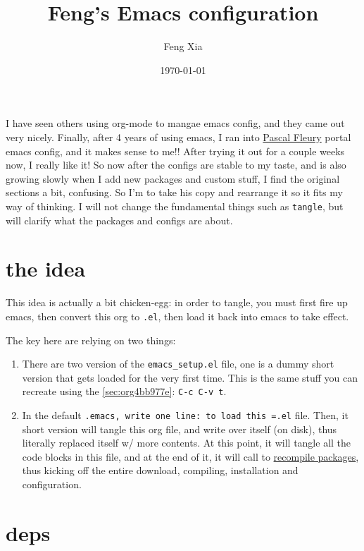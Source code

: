 \documentclass[11pt]{article}
\author{Feng Xia}
\date{\today}
\title{Feng's Emacs configuration}
\begin{document}
\maketitle
\tableofcontents

I have seen others using org-mode to mangae emacs config, and they
came out very nicely. Finally, after 4 years of using emacs, I ran
into \href{https://github.com/pascalfleury/emacs-config}{Pascal Fleury} portal emacs config, and it makes sense to me!!
After trying it out for a couple weeks now, I really like it! So now
after the configs are stable to my taste, and is also growing slowly
when I add new packages and custom stuff, I find the original sections
a bit, confusing. So I'm to take his copy and rearrange it so it fits
my way of thinking. I will not change the fundamental things such as
\texttt{tangle}, but will clarify what the packages and configs are about.

\section{the idea}
\label{sec:org28571e1}

This idea is actually a bit chicken-egg: in order to tangle, you must
first fire up emacs, then convert this org to \texttt{.el}, then load it back
into emacs to take effect.

The key here are relying on two things:

\begin{enumerate}
\item There are two version of the \texttt{emacs\_setup.el} file, one is a dummy
short version that gets loaded for the very first time. This is the
same stuff you can recreate using the \ref{sec:org4bb977e}: \texttt{C-c C-v t}.
\item In the default \texttt{.emacs, write one line: to load this =.el} file. Then,
it short version will tangle this org file, and write over itself
(on disk), thus literally replaced itself w/ more contents. At this
point, it will tangle all the code blocks in this file, and at the
end of it, it will call to \hyperref[sec:org7bb9a16]{recompile packages}, thus kicking off the
entire download, compiling, installation and configuration.
\end{enumerate}

\section{deps}
\label{sec:orgfbdce36}
\end{document}
